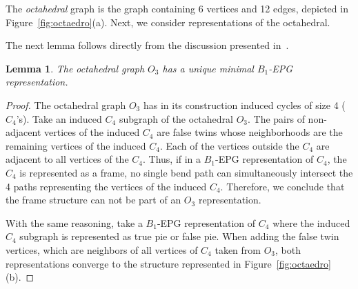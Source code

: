 \documentclass[
submission
]{dmtcs-episciences}
\newtheorem{lemma}[theorem]{Lemma}
\begin{document}
The \textit{octahedral} graph is the graph containing 6 vertices and 12 edges, depicted  in Figure~\ref{fig:octaedro}(a). Next, we consider representations of the octahedral.


The next lemma follows directly from the discussion presented in~\cite{heldt2014}.

\begin{lemma}\label{lem:octaedronaohelly}
The octahedral graph $O_3$ has a unique minimal  $ B_1$-EPG representation.%
\end{lemma}


\begin{proof}
The octahedral graph $ O_3 $ has in its construction induced cycles of size 4 ($ C_4$'s). 
Take an induced $ C_4 $ subgraph  of the octahedral $ O_3 $. The pairs of non-adjacent vertices of the induced $C_4$ are false twins whose neighborhoods are the remaining vertices of the induced $C_4$. Each of the vertices outside the $C_4$ are adjacent to all vertices of the $C_4$. Thus, if in a $ B_1$-EPG representation of $C_4$, the $ C_4 $ is represented as a frame, no single bend path can simultaneously intersect the 4 paths representing the vertices of the induced $ C_4 $. Therefore, we conclude that the frame structure can not be part of an $ O_3 $ representation.

With the same reasoning, take a $ B_1$-EPG representation of $C_4$ where the induced $ C_4 $ subgraph is represented as true pie or false pie.  When adding the false twin vertices, which are neighbors of all vertices of $ C_4 $ taken from $ O_3 $, both representations converge to the structure represented in Figure~\ref{fig:octaedro}(b). 
 \end{proof}
\end{document}
